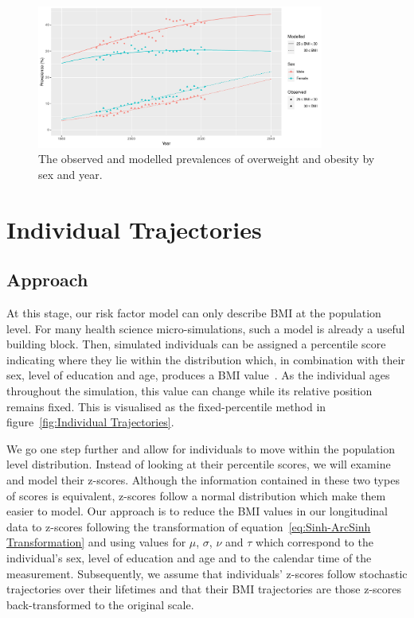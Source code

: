 \documentclass{imammb}
\numberwithin{equation}{section}
\begin{document}
\begin{figure}[!h]
\centering
\includegraphics[width=0.84\textwidth] {"Figures/Historical Trend.pdf"}
\caption{The observed and modelled prevalences of overweight and obesity by sex and year.}
\label{fig:Historical Trend}
\vspace*{-9pt}
\end{figure}

\section{Individual Trajectories}
\label{sec:Individual Trajectories}

\subsection{Approach}
\label{sec:Individual Trajectories/Approach}

At this stage, our risk factor model can only describe BMI at the population level. For many health science micro-simulations, such a model is already a useful building block. Then, simulated individuals can be assigned a percentile score indicating where they lie within the distribution which, in combination with their sex, level of education and age, produces a BMI value~\citep{McPherson2007, OECD2019}. As the individual ages throughout the simulation, this value can change while its relative position remains fixed. This is visualised as the fixed-percentile method in figure~\ref{fig:Individual Trajectories}.

We go one step further and allow for individuals to move within the population level distribution. Instead of looking at their percentile scores, we will examine and model their z-scores. Although the information contained in these two types of scores is equivalent, z-scores follow a normal distribution which make them easier to model. Our approach is to reduce the BMI values in our longitudinal data to z-scores following the transformation of equation~\ref{eq:Sinh-ArcSinh Transformation} and using values for $\mu$, $\sigma$, $\nu$ and $\tau$ which correspond to the individual's sex, level of education and age and to the calendar time of the measurement. Subsequently, we assume that individuals' z-scores follow stochastic trajectories over their lifetimes and that their BMI trajectories are those z-scores back-transformed to the original scale.
\end{document}
